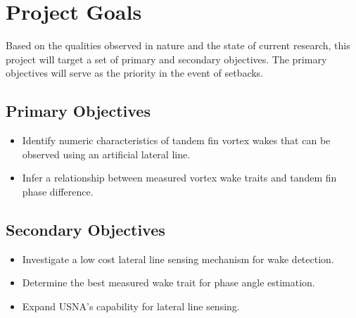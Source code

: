 \section{Project Goals}

    Based on the qualities observed in nature and the state of current research, this project will target a set of primary and secondary objectives. The primary objectives will serve as the priority in the event of setbacks.

\subsection{Primary Objectives}
\begin{itemize}
    \item Identify numeric characteristics of tandem fin vortex wakes that can be observed using an artificial lateral line.
    \item Infer a relationship between measured vortex wake traits and tandem fin phase difference.
\end{itemize}
\subsection{Secondary Objectives}
\begin{itemize}
    \item Investigate a low cost lateral line sensing mechanism for wake detection.
    \item Determine the best measured wake trait for phase angle estimation.
    \item Expand USNA's capability for lateral line sensing.
\end{itemize}
